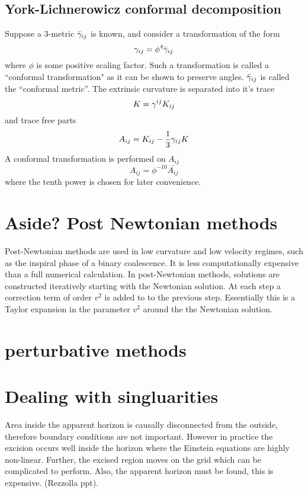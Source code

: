 \subsection{York-Lichnerowicz conformal decomposition}
Suppose a 3-metric $\bar{{\gamma}}_{ij}$ is known, and consider a transformation of the form
\[ {\gamma}_{ij}= \phi^4 \bar{{\gamma}}_{ij} \]
where $\phi$ is some positive scaling factor. Such a transformation is called a ``conformal transformation" as it can be shown to preserve angles. $\bar{{\gamma}}_{ij}$ is called the ``conformal metric''. The extrinsic curvature is separated into it's trace
\[ K={\gamma}^{ij} K_{ij} \]
and trace free parts
\[ A_{ij}=K_{ij} - \frac{1}{3} {\gamma}_{ij}K \]
A conformal transformation is performed on $A_{ij}$
\[ A_{ij}=\phi^{-10}\bar{A_{ij}}\]
where the tenth power is chosen for later convenience. 

\section{Aside? Post Newtonian methods}
Post-Newtonian methods are used in low curvature and low velocity regimes, such as the inspiral phase of a binary coalescence. It is less computationally expensive than a full numerical calculation. In post-Newtonian methods, solutions are constructed iteratively starting with the Newtonian solution. At each step a correction term of order $v^2$ is added to to the previous step. Essentially this is a Taylor expansion in the parameter $v^2$ around the the Newtonian solution. 

\section{perturbative methods}

\section{Dealing with singluarities}
Area inside the apparent horizon is causally disconnected from the outside, therefore boundary conditions are not important. However in practice the excision occurs well inside the horizon where the Einstein equations are highly non-linear. Further, the excised region moves on the grid which can be complicated to perform. Also, the apparent horizon must be found, this is expensive. (Rezzolla ppt).


%